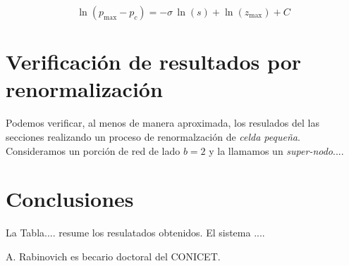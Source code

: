 \documentclass[%
 reprint,
 amsmath,amssymb,
 aps,
spanish]{revtex4-1}
\begin{document}
 
\begin{equation}
\ln(p_\mathrm{max}-p_c)=-\sigma\,\ln(s)+\ln(z_\mathrm{max})+C\label{eqn_3}
\end{equation}


\section{\label{R} Verificaci\'on de resultados por renormalizaci\'on}

Podemos verificar, al menos de manera aproximada, los resulados del las secciones realizando un proceso de renormalzaci\'on de \emph{celda peque\~na}. Consideramos un porci\'on de red de lado $b=2$ y la llamamos un \emph{super-nodo}....

\section{\label{conclusions}Conclusiones}

La Tabla.... resume los resulatados obtenidos. El sistema ....


\begin{acknowledgments}
A. Rabinovich es becario doctoral del CONICET. 
\end{acknowledgments}

\appendix
\end{document}
